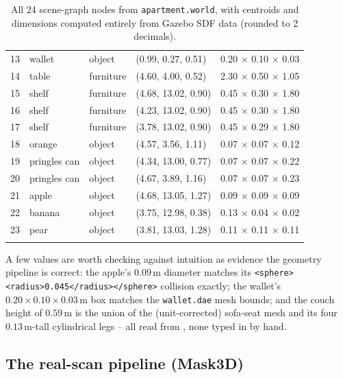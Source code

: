 \documentclass[11pt]{article}
\begin{document}
\begin{center}
\begin{longtable}{c l l l l}
13 & wallet       & object    & (0.99, 0.27, 0.51)  & 0.20 $\times$ 0.10 $\times$ 0.03 \\
14 & table        & furniture & (4.60, 4.00, 0.52)  & 2.30 $\times$ 0.50 $\times$ 1.05 \\
15 & shelf        & furniture & (4.68, 13.02, 0.90) & 0.45 $\times$ 0.30 $\times$ 1.80 \\
16 & shelf        & furniture & (4.23, 13.02, 0.90) & 0.45 $\times$ 0.30 $\times$ 1.80 \\
17 & shelf        & furniture & (3.78, 13.02, 0.90) & 0.45 $\times$ 0.29 $\times$ 1.80 \\
18 & orange       & object    & (4.57, 3.56, 1.11)  & 0.07 $\times$ 0.07 $\times$ 0.12 \\
19 & pringles can & object    & (4.34, 13.00, 0.77) & 0.07 $\times$ 0.07 $\times$ 0.22 \\
20 & pringles can & object    & (4.67, 3.89, 1.16)  & 0.07 $\times$ 0.07 $\times$ 0.23 \\
21 & apple        & object    & (4.68, 13.05, 1.27) & 0.09 $\times$ 0.09 $\times$ 0.09 \\
22 & banana       & object    & (3.75, 12.98, 0.38) & 0.13 $\times$ 0.04 $\times$ 0.02 \\
23 & pear         & object    & (3.81, 13.03, 1.28) & 0.11 $\times$ 0.11 $\times$ 0.11 \\
\bottomrule
\caption{All 24 scene-graph nodes from \texttt{apartment.world}, with
centroids and dimensions computed entirely from Gazebo SDF data (rounded to
2 decimals).}
\label{tab:results}
\end{longtable}
\end{center}

A few values are worth checking against intuition as evidence the geometry
pipeline is correct: the apple's $0.09\,\text{m}$ diameter matches its
\texttt{<sphere><radius>0.045</radius></sphere>} collision exactly; the
wallet's $0.20\times0.10\times0.03\,\text{m}$ box matches the
\texttt{wallet.dae} mesh bounds; and the couch height of $0.59\,\text{m}$ is
the union of the (unit-corrected) sofa-seat mesh and its four
$0.13\,\text{m}$-tall cylindrical legs -- all read from
, none
typed in by hand.

\subsection{The real-scan pipeline (Mask3D)}
\label{sec:mask3d}
\end{document}
